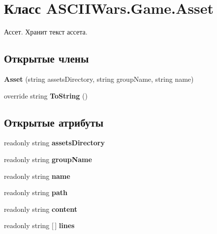 \hypertarget{class_a_s_c_i_i_wars_1_1_game_1_1_asset}{}\section{Класс A\+S\+C\+I\+I\+Wars.\+Game.\+Asset}
\label{class_a_s_c_i_i_wars_1_1_game_1_1_asset}


Ассет. Хранит текст ассета.  


\subsection*{Открытые члены}
\begin{DoxyCompactItemize}
\item 
\hypertarget{class_a_s_c_i_i_wars_1_1_game_1_1_asset_ab587d66e5e4257ab6baa804b00f2b112}{}\label{class_a_s_c_i_i_wars_1_1_game_1_1_asset_ab587d66e5e4257ab6baa804b00f2b112} 
{\bfseries Asset} (string assets\+Directory, string group\+Name, string name)
\item 
\hypertarget{class_a_s_c_i_i_wars_1_1_game_1_1_asset_aaf8fcd0eea1ca1b6a5cd26be7ee8c24c}{}\label{class_a_s_c_i_i_wars_1_1_game_1_1_asset_aaf8fcd0eea1ca1b6a5cd26be7ee8c24c} 
override string {\bfseries To\+String} ()
\end{DoxyCompactItemize}
\subsection*{Открытые атрибуты}
\begin{DoxyCompactItemize}
\item 
\hypertarget{class_a_s_c_i_i_wars_1_1_game_1_1_asset_ac77e5c7b34bf76f64cc56e2519e4ef10}{}\label{class_a_s_c_i_i_wars_1_1_game_1_1_asset_ac77e5c7b34bf76f64cc56e2519e4ef10} 
readonly string {\bfseries assets\+Directory}
\item 
\hypertarget{class_a_s_c_i_i_wars_1_1_game_1_1_asset_abdde541a3e0a35d1f80de3ceaea7db50}{}\label{class_a_s_c_i_i_wars_1_1_game_1_1_asset_abdde541a3e0a35d1f80de3ceaea7db50} 
readonly string {\bfseries group\+Name}
\item 
\hypertarget{class_a_s_c_i_i_wars_1_1_game_1_1_asset_a5bd9f716708c7943bdd313357da7d7f3}{}\label{class_a_s_c_i_i_wars_1_1_game_1_1_asset_a5bd9f716708c7943bdd313357da7d7f3} 
readonly string {\bfseries name}
\item 
\hypertarget{class_a_s_c_i_i_wars_1_1_game_1_1_asset_a2d1d00016592f2930725bf14a2a05fb8}{}\label{class_a_s_c_i_i_wars_1_1_game_1_1_asset_a2d1d00016592f2930725bf14a2a05fb8} 
readonly string {\bfseries path}
\item 
\hypertarget{class_a_s_c_i_i_wars_1_1_game_1_1_asset_a6be81140383341818eaea6ffd8c6c29b}{}\label{class_a_s_c_i_i_wars_1_1_game_1_1_asset_a6be81140383341818eaea6ffd8c6c29b} 
readonly string {\bfseries content}
\item 
\hypertarget{class_a_s_c_i_i_wars_1_1_game_1_1_asset_ab69cdc626d285fd7e8415f0b7cb25f54}{}\label{class_a_s_c_i_i_wars_1_1_game_1_1_asset_ab69cdc626d285fd7e8415f0b7cb25f54} 
readonly string \mbox{[}$\,$\mbox{]} {\bfseries lines}
\end{DoxyCompactItemize}


